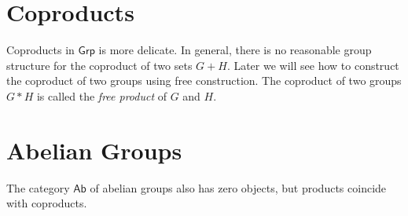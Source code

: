 \documentclass{amsart}
\begin{document}
\section{Coproducts}
\label{sec:coproducts}

Coproducts in $\mathsf{Grp}$ is more delicate.
In general, there is no reasonable group structure for the coproduct of two sets $G + H$.
Later we will see how to construct the coproduct of two groups using free construction.
The coproduct of two groups $G * H$ is called the \emph{free product} of $G$ and $H$.

\section{Abelian Groups}
\label{sec:abelian-groups}

The category $\mathsf{Ab}$ of abelian groups also has zero objects, but products coincide with coproducts.
\end{document}
